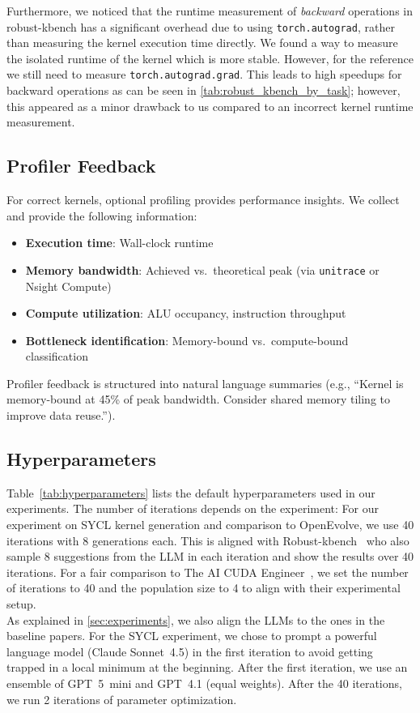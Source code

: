 Furthermore, we noticed that the runtime measurement of \textit{backward} operations in robust-kbench has a significant overhead due to using \texttt{torch.autograd}, rather than measuring the kernel execution time directly. We found a way to measure the isolated runtime of the kernel which is more stable. However, for the reference we still need to measure \texttt{torch.autograd.grad}. This leads to high speedups for backward operations as can be seen in \autoref{tab:robust_kbench_by_task}; however, this appeared as a minor drawback to us compared to an incorrect kernel runtime measurement.

\subsection{Profiler Feedback}

For correct kernels, optional profiling provides performance insights. We collect and provide the following information:
\begin{itemize}\itemsep0em
    \item \textbf{Execution time}: Wall-clock runtime
    \item \textbf{Memory bandwidth}: Achieved vs.\ theoretical peak (via \texttt{unitrace} or Nsight Compute)
    \item \textbf{Compute utilization}: ALU occupancy, instruction throughput
    \item \textbf{Bottleneck identification}: Memory-bound vs.\ compute-bound classification
\end{itemize}

Profiler feedback is structured into natural language summaries (e.g., ``Kernel is memory-bound 
at 45\% of peak bandwidth. Consider shared memory tiling to improve data reuse.'').


\subsection{Hyperparameters}\label{app:hyperparameters}

Table~\ref{tab:hyperparameters} lists the default hyperparameters used in our experiments. 
The number of iterations depends on the experiment: For our experiment on SYCL kernel generation and comparison to OpenEvolve, we use 40 iterations with 8 generations each. This is aligned with Robust-kbench~\cite{lange2025towards} who also sample 8 suggestions from the LLM in each iteration and show the results over 40 iterations. For a fair comparison to The AI CUDA Engineer~\cite{lange2025ai}, we set the number of iterations to 40 and the population size to 4 to align with their experimental setup.\\ As explained in \autoref{sec:experiments}, we also align the LLMs to the ones in the baseline papers. For the SYCL experiment, we chose to prompt a powerful language model (Claude Sonnet~4.5) in the first iteration to avoid getting trapped in a local minimum at the beginning. After the first iteration, we use an ensemble of GPT~5~mini and GPT~4.1 (equal weights). After the 40 iterations, we run 2 iterations of parameter optimization. 

